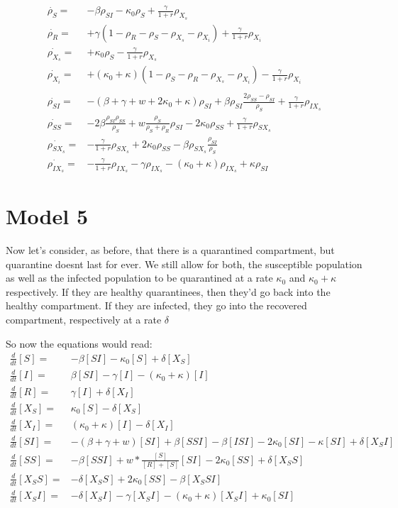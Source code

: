 \documentclass[a4paper,10pt]{article}
\begin{document}
 \begin{align}
  \dot{\rho_S}=&-\beta \rho_{SI}-\kappa_0\rho_S+ \frac{\gamma}{1+r} \rho_{X_s}\\
  \dot{\rho_{R}}=&+
  \gamma(1-\rho_{R}-\rho_{S}-\rho_{X_s}-\rho_{X_i}) +\frac{\gamma}{1+r} \rho_{X_i}\\
  \dot {\rho_{X_s}}=&+
  \kappa_0\rho_S - \frac{\gamma}{1+r} \rho_{X_s}\\
  \dot {\rho_{X_i}}= &
  +(\kappa_0+\kappa)(1-\rho_{S}-\rho_{R}-\rho_{X_s}-\rho_{X_i}) - \frac{\gamma}{1+r} \rho_{X_i}\\
  &\nonumber\\
  \dot{\rho_{SI}}=&
  -(\beta+\gamma+w+2\kappa_0+\kappa)\rho_{SI}+\beta\rho_{SI}\frac{2\rho_{SS}-\rho_{SI}}{\rho_S}+ \frac{\gamma}{1+r} \rho_{IX_s}\\
  \dot{\rho_{SS}}=& - 2\beta\frac{\rho_{SI}\rho_{SS}}{\rho_{S}}+w\frac{\rho_S}{\rho_S+\rho_{R}}\rho_{SI} - 2\kappa_0\rho_{SS} + \frac{\gamma}{1+r}\rho_{SX_{s}}\\
  \dot{\rho_{SX_{s}}}=&
  -\frac{\gamma}{1+r}\rho_{SX_s}+2\kappa_0\rho_{SS}-\beta\rho_{SX_{s}}\frac{\rho_{SI}}{\rho_S}\\
  \dot{\rho_{IX_{s}}}=&
  -\frac{\gamma}{1+r}\rho_{IX_{s}}-\gamma\rho_{IX_{s}}-(\kappa_0+\kappa)\rho_{IX_{s}}+\kappa\rho_{SI}
 \end{align}

 
 \section{Model 5}

Now let's consider, as before, that there is a quarantined compartment, but quarantine doesnt last for ever. We still allow for both, the susceptible population as well as the infected population to be quarantined at a rate $\kappa_0$ and $\kappa_0+\kappa$ respectively. If they are healthy quarantinees, then they'd go back into the healthy compartment. If they are infected, they go into the recovered compartment, respectively at a rate $\delta$

So now the equations would read:
\begin{align}
 \frac{d}{dt} [S]
 =&
 -\beta [SI] - \kappa_0[S] +\delta[X_S]
 \\
 \frac{d}{dt} [I]
 =&
 \beta [SI] - \gamma [I] - (\kappa_0+\kappa)[I] 
 \\
 \frac{d}{dt} [R]
 =&
\gamma [I] +\delta[X_I]
 \\
 \frac{d}{dt} [X_S]
 =&
\kappa_0 [S] - \delta[X_S]
 \\
 \frac{d}{dt} [X_I]
 =&
(\kappa_0 +\kappa) [I] - \delta[X_I]
 \\
 \frac{d}{dt} [SI]
 =&
 -(\beta+\gamma+w)[SI] + \beta[SSI] -\beta[ISI] -2\kappa_0 [SI] - \kappa [SI] + \delta [X_{S}I] 
 \\
 \frac{d}{dt} [SS]
 =&
- \beta [SSI] + w*\frac{[S]}{[R]+[S]} [SI] -2\kappa_0 [SS] + \delta[X_{S}S]  \\
 \frac{d}{dt} [X_{S}S]
 =&
 -\delta [X_{S}S] + 2\kappa_0[SS]
 -\beta [X_{S}SI]
 \\
 \frac{d}{dt} [X_{S}I]
 =&
 -\delta[X_{S}I] - \gamma [X_{S}I] -(\kappa_0+\kappa)[X_{S}I] + \kappa_0 [SI]
 \end{align}
 
\end{document}
